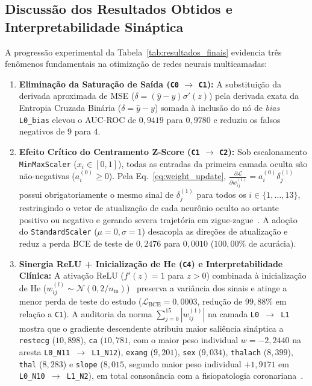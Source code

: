 \documentclass[runningheads]{llncs}
\begin{document}
\subsection{Discuss\~{a}o dos Resultados Obtidos e Interpretabilidade Sin\'{a}ptica}
A progress\~{a}o experimental da Tabela~\ref{tab:resultados_finais} evidencia tr\^{e}s fen\^{o}menos fundamentais na otimiza\c{c}\~{a}o de redes neurais multicamadas:
\begin{enumerate}
    \item \textbf{Elimina\c{c}\~{a}o da Satura\c{c}\~{a}o de Sa\'{i}da (\texttt{C0} $\to$ \texttt{C1}):} A substitui\c{c}\~{a}o da derivada aproximada de MSE ($\delta = (\hat{y}-y)\sigma'(z)$) pela derivada exata da Entropia Cruzada Bin\'{a}ria ($\delta = \hat{y}-y$) somada \`{a} inclus\~{a}o do n\'{o} de \textit{bias} \texttt{L0\_bias} elevou o AUC-ROC de $0{,}9419$ para $0{,}9780$ e reduziu os falsos negativos de $9$ para $4$.
    \item \textbf{Efeito Cr\'{i}tico do Centramento Z-Score (\texttt{C1} $\to$ \texttt{C2}):} Sob escalonamento \texttt{MinMaxScaler} ($x_i \in [0, 1]$), todas as entradas da primeira camada oculta s\~{a}o n\~{a}o-negativas ($a_i^{(0)} \ge 0$). Pela Eq.~\eqref{eq:weight_update}, $\frac{\partial \mathcal{L}}{\partial w_{ij}^{(1)}} = a_i^{(0)}\delta_j^{(1)}$ possui obrigatoriamente o mesmo sinal de $\delta_j^{(1)}$ para todos os $i \in \{1,\dots,13\}$, restringindo o vetor de atualiza\c{c}\~{a}o de cada neur\^{o}nio oculto ao ortante positivo ou negativo e gerando severa trajet\'{o}ria em zigue-zague~\cite{lecun1998efficient}. A ado\c{c}\~{a}o do \texttt{StandardScaler} ($\mu=0, \sigma=1$) desacopla as dire\c{c}\~{o}es de atualiza\c{c}\~{a}o e reduz a perda BCE de teste de $0{,}2476$ para $0{,}0010$ ($100{,}00\%$ de acur\'{a}cia).
    \item \textbf{Sinergia ReLU + Inicializa\c{c}\~{a}o de He (\texttt{C4}) e Interpretabilidade Cl\'{i}nica:} A ativa\c{c}\~{a}o ReLU ($f'(z)=1$ para $z>0$) combinada \`{a} inicializa\c{c}\~{a}o de He ($w_{ij}^{(l)} \sim \mathcal{N}(0, 2/n_{\text{in}})$)~\cite{he2015delving} preserva a vari\^{a}ncia dos sinais e atinge a menor perda de teste do estudo ($\mathcal{L}_{\text{BCE}} = 0{,}0003$, redu\c{c}\~{a}o de $99{,}88\%$ em rela\c{c}\~{a}o a \texttt{C1}). A auditoria da norma $\sum_{j=0}^{15} |w_{ij}^{(1)}|$ na camada \texttt{L0 $\to$ L1} mostra que o gradiente descendente atribuiu maior saliência sin\'{a}ptica a \texttt{restecg} ($10{,}898$), \texttt{ca} ($10{,}781$, com o maior peso individual $w = -2{,}2440$ na aresta \texttt{L0\_N11 $\to$ L1\_N12}), \texttt{exang} ($9{,}201$), \texttt{sex} ($9{,}034$), \texttt{thalach} ($8{,}399$), \texttt{thal} ($8{,}283$) e \texttt{slope} ($8{,}015$, segundo maior peso individual $+1{,}9171$ em \texttt{L0\_N10 $\to$ L1\_N2}), em total conson\^{a}ncia com a fisiopatologia coronariana~\cite{detrano1989international}.
\end{enumerate}
\end{document}
